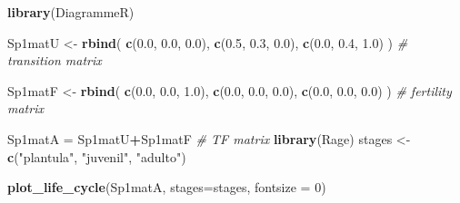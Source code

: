 \documentclass[
]{book}
\newenvironment{Shaded}{\begin{snugshade}}{\end{snugshade}}
\newcommand{\AttributeTok}[1]{\textcolor[rgb]{0.13,0.29,0.53}{#1}}
\newcommand{\CommentTok}[1]{\textcolor[rgb]{0.56,0.35,0.01}{\textit{#1}}}
\newcommand{\DecValTok}[1]{\textcolor[rgb]{0.00,0.00,0.81}{#1}}
\newcommand{\FloatTok}[1]{\textcolor[rgb]{0.00,0.00,0.81}{#1}}
\newcommand{\FunctionTok}[1]{\textcolor[rgb]{0.13,0.29,0.53}{\textbf{#1}}}
\newcommand{\NormalTok}[1]{#1}
\newcommand{\OtherTok}[1]{\textcolor[rgb]{0.56,0.35,0.01}{#1}}
\newcommand{\SpecialCharTok}[1]{\textcolor[rgb]{0.81,0.36,0.00}{\textbf{#1}}}
\newcommand{\StringTok}[1]{\textcolor[rgb]{0.31,0.60,0.02}{#1}}
\theoremstyle{definition}
\theoremstyle{definition}
\theoremstyle{definition}
\theoremstyle{definition}
\theoremstyle{remark}
\begin{document}
\begin{Shaded}
\begin{Highlighting}[]
\FunctionTok{library}\NormalTok{(DiagrammeR)}

\NormalTok{Sp1matU }\OtherTok{\textless{}{-}} \FunctionTok{rbind}\NormalTok{(}
  \FunctionTok{c}\NormalTok{(}\FloatTok{0.0}\NormalTok{, }\FloatTok{0.0}\NormalTok{, }\FloatTok{0.0}\NormalTok{),}
  \FunctionTok{c}\NormalTok{(}\FloatTok{0.5}\NormalTok{, }\FloatTok{0.3}\NormalTok{, }\FloatTok{0.0}\NormalTok{),}
  \FunctionTok{c}\NormalTok{(}\FloatTok{0.0}\NormalTok{, }\FloatTok{0.4}\NormalTok{, }\FloatTok{1.0}\NormalTok{)}
\NormalTok{) }\CommentTok{\# transition matrix}

\NormalTok{Sp1matF }\OtherTok{\textless{}{-}} \FunctionTok{rbind}\NormalTok{(}
  \FunctionTok{c}\NormalTok{(}\FloatTok{0.0}\NormalTok{, }\FloatTok{0.0}\NormalTok{, }\FloatTok{1.0}\NormalTok{),}
  \FunctionTok{c}\NormalTok{(}\FloatTok{0.0}\NormalTok{, }\FloatTok{0.0}\NormalTok{, }\FloatTok{0.0}\NormalTok{),}
  \FunctionTok{c}\NormalTok{(}\FloatTok{0.0}\NormalTok{, }\FloatTok{0.0}\NormalTok{, }\FloatTok{0.0}\NormalTok{)}
\NormalTok{) }\CommentTok{\# fertility matrix}

\NormalTok{Sp1matA }\OtherTok{=}\NormalTok{ Sp1matU}\SpecialCharTok{+}\NormalTok{Sp1matF }\CommentTok{\# TF matrix}
\FunctionTok{library}\NormalTok{(Rage)}
\NormalTok{stages }\OtherTok{\textless{}{-}} \FunctionTok{c}\NormalTok{(}\StringTok{"plantula"}\NormalTok{, }\StringTok{"juvenil"}\NormalTok{, }\StringTok{"adulto"}\NormalTok{)}

\FunctionTok{plot\_life\_cycle}\NormalTok{(Sp1matA, }\AttributeTok{stages=}\NormalTok{stages, }\AttributeTok{fontsize =} \DecValTok{0}\NormalTok{)}
\end{Highlighting}
\end{Shaded}
\end{document}
